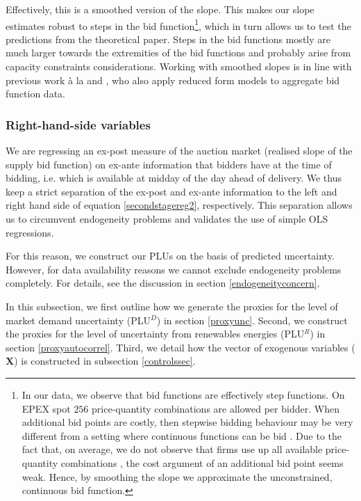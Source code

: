Effectively, this is a smoothed version of the slope. This makes our slope estimates robust to steps in the bid function\footnote{In our data, we observe that bid functions are effectively step functions. On EPEX spot $256$ price-quantity combinations are allowed per bidder. When additional bid points are costly, then stepwise bidding behaviour may be very different from a setting where continuous functions can be bid \cite{kastl2011discrete}. Due to the fact that, on average, we do not observe that firms use up all available price-quantity combinations , the cost argument of an additional bid point seems weak. Hence, by smoothing the slope we approximate the unconstrained, continuous bid function. }, which in turn allows us to test the predictions from the theoretical paper. 
Steps in the bid functions mostly are much larger towards the extremities of the bid functions and probably arise from capacity constraints considerations. 
Working with smoothed slopes is  in line with previous work \`{a} la \cite{pw2002etude} and \cite{ozcan2004logistic}, who also apply reduced form models to aggregate bid function data. 


\subsubsection{Right-hand-side variables}
\label{RHS}

We are regressing an ex-post measure of the auction market (realised slope of the supply bid function) on ex-ante information that bidders have at the time of bidding, i.e. which is available at midday of the day ahead of delivery.  
We thus keep a strict separation of the ex-post and  ex-ante information to the left  and right hand side of equation \ref{secondstagereg2}, respectively. This separation allows us to circumvent endogeneity problems and  validates the use of simple OLS regressions. 

For this reason, we construct our PLUs on the basis of predicted uncertainty. However, for data availability reasons we cannot exclude endogeneity problems completely. For details, see the discussion in section \ref{endogeneityconcern}.  

In this subsection, we first outline how we generate the proxies for the level of market demand uncertainty (PLU$^D$) in section \ref{proxyunc}. Second, we construct the proxies for the level of uncertainty from renewables energies (PLU$^R$) in section \ref{proxyautocorrel}. Third, we detail how the vector of exogenous variables ($\boldsymbol{X}$) is constructed in subsection \ref{controlssec}.  


